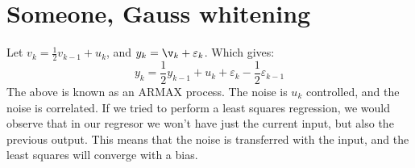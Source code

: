 \section{Someone, Gauss whitening}

\ex{}
{
    Let $v_k = \frac{1}{2}v_{k-1} + u_k$, and $y_k = \v_k + \varepsilon_k$.
    Which gives:
    \begin{equation}
        y_k = \frac{1}{2}y_{k-1} + u_k + \varepsilon_k -\frac{1}{2}\varepsilon_{k-1}
    \end{equation}
    The above is known as an ARMAX process. The noise is $u_k$ controlled, and the noise is correlated. If we tried to perform a least squares regression, we would observe that in our regresor we won't have just the current input, but also the previous output. This means that the noise is transferred with the input, and the least squares will converge with a bias.


}


